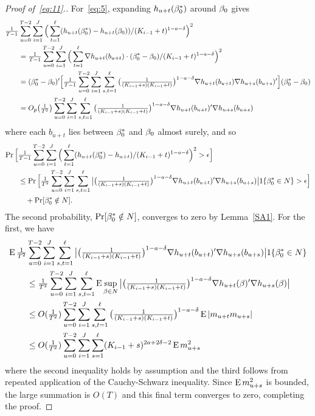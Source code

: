 \documentclass[12pt,fleqn]{article}
\begin{document}
\begin{proof}[Proof of~\eqref{eq:11}.]
For~\eqref{eq:5}, expanding $h_{u+t}(\beta_0^*)$ around $\beta_0$ gives
\begin{align*}
  \tfrac{1}{T-1} & \sum_{u = 0}^{T-2} \sum_{i=1}^J \Big(\sum_{t = 1}^{\ell} (h_{u + t}(\beta_0^*) - h_{u + t}(\beta_0))/ (K_{i-1} + t)^{1-a-\delta} \Big)^2 \\
  &= \tfrac{1}{T-1} \sum_{u = 0}^{T-2} \sum_{i=1}^J \Big(\sum_{t = 1}^{\ell}
  \nabla h_{u + t}(b_{u+t}) \cdot (\beta_0^* - \beta_0) / (K_{i-1} + t)^{1-a-\delta}\Big)^2 \\
  &= (\beta_0^* - \beta_0)' \Big[\tfrac{1}{T-1} \sum_{u = 0}^{T-2} \sum_{i=1}^J \sum_{s,t = 1}^{\ell}
  \big(\tfrac{1}{(K_{i-1} + s) (K_{i-1} + t)}\big)^{1-a-\delta} \nabla h_{u + t}(b_{u+t}) \nabla h_{u + s}(b_{u+s})' \Big] (\beta_0^* - \beta_0) \\
  &= O_p\big(\tfrac{1}{T^2}\big) \sum_{u = 0}^{T-2} \sum_{i=1}^J \sum_{s,t = 1}^{\ell}
  \big(\tfrac{1}{(K_{i-1} + s) (K_{i-1} + t)}\big)^{1-a-\delta} \nabla h_{u + t}(b_{u+t})' \nabla h_{u + s}(b_{u+s})
\end{align*}
where each $b_{u+t}$ lies between $\beta_0^*$ and $\beta_0$ almost surely, and so
\begin{align*}
  \operatorname{Pr}\Big[& \tfrac{1}{T-1} \sum_{u = 0}^{T-2} \sum_{i=1}^J
  \Big(\sum_{t = 1}^{\ell} (h_{u + t}(\beta_0^*) - h_{u + t})/ (K_{i-1} + t)^{1-a-\delta}\Big)^2 > \epsilon \Big] \\
  & \leq \operatorname{Pr}\Big[ \tfrac{1}{T^2} \sum_{u = 0}^{T-2} \sum_{i=1}^J \sum_{s,t = 1}^{\ell}
  \big\lvert \big(\tfrac{1}{(K_{i-1} + s) (K_{i-1} + t)}\big)^{1-a-\delta}
  \nabla h_{u + t}(b_{u+t})' \nabla h_{u + s}(b_{u+s}) \big\rvert 1\{\beta_0^* \in N\} > \epsilon \Big] \\
  &\quad + \operatorname{Pr}[\beta_0^* \notin N].
\end{align*}
The second probability, $\operatorname{Pr}[\beta_0^* \notin N]$, converges to zero by
Lemma~\ref{SA1}. For the first, we have
\begin{align*}
  \operatorname{E} \tfrac{1}{T^2} &\sum_{u = 0}^{T-2} \sum_{i=1}^J \sum_{s,t = 1}^{\ell}
  \big\lvert \big(\tfrac{1}{(K_{i-1} + s) (K_{i-1} + t)}\big)^{1-a-\delta}
  \nabla h_{u + t}(b_{u+t})' \nabla h_{u + s}(b_{u+s}) \big\rvert 1\{\beta_0^* \in N\} \\
  &\leq \tfrac{1}{T^2} \sum_{u = 0}^{T-2} \sum_{i=1}^J \sum_{s,t = 1}^{\ell}
  \operatorname{E} \sup_{\beta \in N} \big\lvert \big(\tfrac{1}{(K_{i-1} + s) (K_{i-1} + t)}\big)^{1-a-\delta}
  \nabla h_{u + t}(\beta)' \nabla h_{u + s}(\beta) \big\rvert \\
  &\leq O(\tfrac{1}{T^2}) \sum_{u = 0}^{T-2} \sum_{i=1}^J \sum_{s,t = 1}^{\ell}
  \big(\tfrac{1}{(K_{i-1} + s) (K_{i-1} + t)}\big)^{1-a-\delta} \operatorname{E} | m_{u+t} m_{u+s} | \\
  &\leq O(\tfrac{1}{T^2}) \sum_{u=0}^{T-2} \sum_{i=1}^J \sum_{s = 1}^{\ell} (K_{i-1} + s)^{2a + 2\delta - 2} \operatorname{E} m_{u+s}^2
\end{align*}
where the second inequality holds by assumption and the third follows
from repeated application of the Cauchy-Schwarz inequality. Since $\operatorname{E}
m_{u+s}^2$ is bounded, the large summation is $O(T)$ and this final
term converges to zero, completing the proof.
\end{proof}
\end{document}
